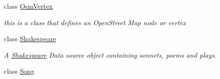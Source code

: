 \begin{DoxyCompactItemize}
\item 
class \hyperlink{classbridges_1_1data__src__dependent_1_1_osm_vertex}{Osm\+Vertex}
\begin{DoxyCompactList}\small\item\em this is a class that defines an Open\+Street Map node or vertex \end{DoxyCompactList}\item 
class \hyperlink{classbridges_1_1data__src__dependent_1_1_shakespeare}{Shakespeare}
\begin{DoxyCompactList}\small\item\em A \hyperlink{classbridges_1_1data__src__dependent_1_1_shakespeare}{Shakespeare} Data source object containing sonnets, poems and plays. \end{DoxyCompactList}\item 
class \hyperlink{classbridges_1_1data__src__dependent_1_1_song}{Song}
\end{DoxyCompactItemize}
